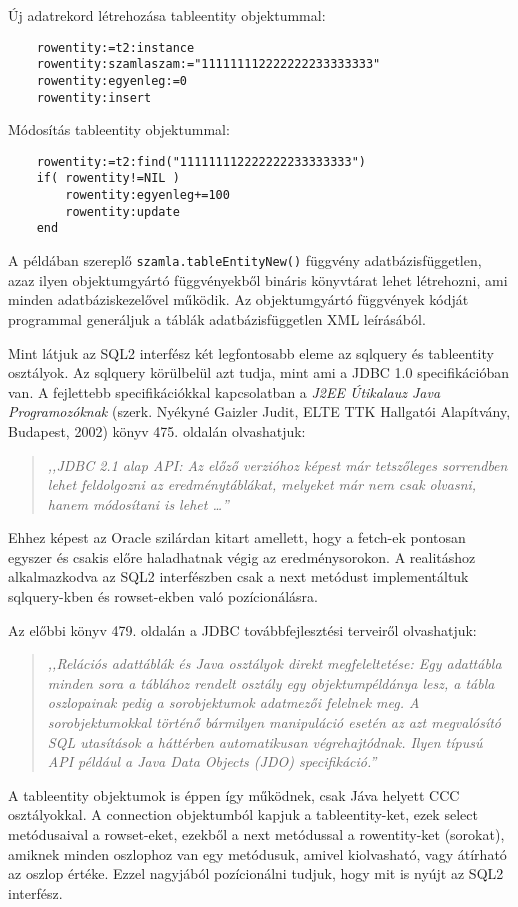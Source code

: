 Új adatrekord létrehozása tableentity objektummal:

\begin{verbatim}
    rowentity:=t2:instance
    rowentity:szamlaszam:="111111112222222233333333"
    rowentity:egyenleg:=0
    rowentity:insert
\end{verbatim}

Módosítás tableentity objektummal:

\begin{verbatim}
    rowentity:=t2:find("111111112222222233333333")
    if( rowentity!=NIL )
        rowentity:egyenleg+=100
        rowentity:update
    end
\end{verbatim}

A példában szereplő \verb!szamla.tableEntityNew()!
függvény adatbázisfüggetlen, azaz ilyen objektumgyártó 
függvényekből bináris könyvtárat lehet létrehozni, ami
minden adatbáziskezelővel működik. Az objektumgyártó 
függvények kódját programmal generáljuk a táblák
adatbázisfüggetlen XML leírásából.

Mint látjuk az SQL2 interfész két legfontosabb eleme az sqlquery és
tableentity osztályok. Az sqlquery körülbelül azt tudja, mint ami 
a JDBC 1.0 specifikációban van. A fejlettebb specifikációkkal 
kapcsolatban a {\em J2EE Útikalauz Java Programozóknak\/}
(szerk. Nyékyné Gaizler Judit, ELTE TTK Hallgatói Alapítvány, Budapest, 2002) 
könyv 475. oldalán olvashatjuk: 
\begin{quote}\it
    ,,JDBC 2.1 alap API: Az előző verzióhoz képest már tetszőleges
    sorrendben lehet feldolgozni az eredménytáblákat, melyeket
    már nem csak olvasni, hanem módosítani is lehet \ldots''
\end{quote}
Ehhez képest az Oracle szilárdan kitart amellett, 
hogy a fetch-ek pontosan egyszer és csakis 
előre haladhatnak végig az eredménysorokon. 
A realitáshoz alkalmazkodva az SQL2 interfészben
csak a next metódust implementáltuk sqlquery-kben és rowset-ekben 
való pozícionálásra.

Az előbbi könyv 479. oldalán a JDBC továbbfejlesztési
terveiről olvashatjuk:
\begin{quote}\it
    ,,Relációs adattáblák és Java osztályok direkt megfeleltetése:
    Egy adattábla minden sora a táblához rendelt osztály egy
    objektumpéldánya lesz, a tábla oszlopainak pedig a sorobjektumok
    adatmezői felelnek meg. A sorobjektumokkal történő bármilyen manipuláció
    esetén az azt megvalósító SQL utasítások a háttérben automatikusan
    végrehajtódnak. Ilyen típusú API például a Java Data Objects  (JDO)
    specifikáció.''
\end{quote}
A tableentity objektumok is éppen így működnek, csak Jáva helyett
CCC osztályokkal. A connection objektumból kapjuk a tableentity-ket,
ezek select metódusaival a rowset-eket, ezekből a next metódussal a 
rowentity-ket (sorokat), amiknek minden oszlophoz van egy metódusuk,
amivel kiolvasható, vagy átírható az oszlop értéke.
Ezzel nagyjából pozícionálni tudjuk, hogy mit is nyújt az SQL2 interfész.

